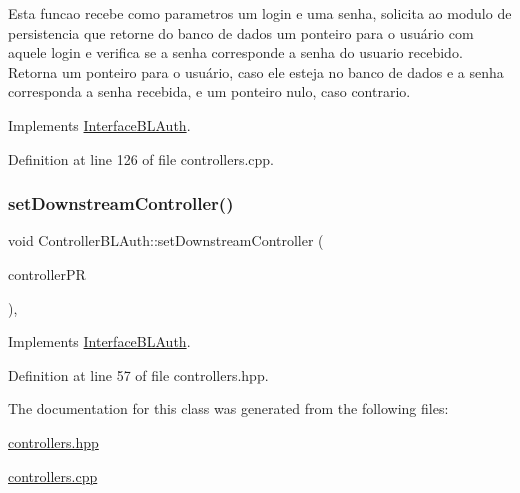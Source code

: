 Esta funcao recebe como parametros um login e uma senha, solicita ao modulo de persistencia que retorne do banco de dados um ponteiro para o usuário com aquele login e verifica se a senha corresponde a senha do usuario recebido. Retorna um ponteiro para o usuário, caso ele esteja no banco de dados e a senha corresponda a senha recebida, e um ponteiro nulo, caso contrario. 

Implements \hyperlink{class_interface_b_l_auth_a326fb6aafafebecbbaf0db346633c996}{Interface\+B\+L\+Auth}.



Definition at line 126 of file controllers.\+cpp.

\mbox{\label{class_controller_b_l_auth_ae514249d909d1449d23f1d2fe7b85eea}} 
\subsubsection{\texorpdfstring{set\+Downstream\+Controller()}{setDownstreamController()}}
{\footnotesize\ttfamily void Controller\+B\+L\+Auth\+::set\+Downstream\+Controller (\begin{DoxyParamCaption}\item[{\hyperlink{class_stub_p_r}{Stub\+PR} $\ast$}]{controller\+PR }\end{DoxyParamCaption})\hspace{0.3cm}{\ttfamily [inline]}, {\ttfamily [virtual]}}



Implements \hyperlink{class_interface_b_l_auth_a738de797493eb2def64b6bf23b911a23}{Interface\+B\+L\+Auth}.



Definition at line 57 of file controllers.\+hpp.



The documentation for this class was generated from the following files\+:\begin{DoxyCompactItemize}
\item 
\hyperlink{controllers_8hpp}{controllers.\+hpp}\item 
\hyperlink{controllers_8cpp}{controllers.\+cpp}\end{DoxyCompactItemize}
